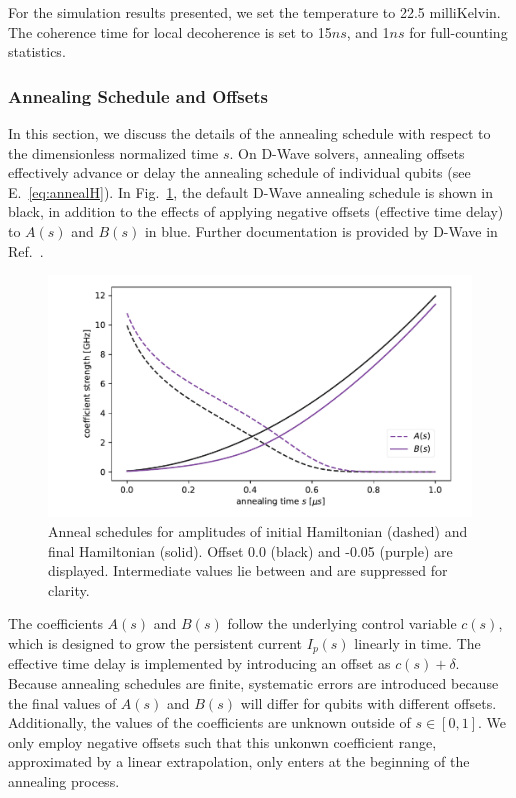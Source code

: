 \documentclass[prd,twocolumn,tightenlines,preprintnumbers,showpacs,superscriptaddress,notitlepage,nofootinbib,eqsecnum,floatfix,longbibliography,aps,10pt]{revtex4-1}
\begin{document}
For the simulation results presented, we set the temperature to 22.5 milliKelvin.
The coherence time for local decoherence is set to 15$ns$, and 1$ns$ for full-counting statistics.

\subsubsection{Annealing Schedule and Offsets}
\label{sec:methods:annealing-schedule}
In this section, we discuss the details of the annealing schedule with respect to the dimensionless normalized time $s$.
On D-Wave solvers, annealing offsets effectively advance or delay the annealing schedule of individual qubits (see E.~\eqref{eq:annealH}).
In Fig.~\ref{fig:anneal_schedule}, the default D-Wave annealing schedule is shown in black, in addition to the effects of applying negative offsets (effective time delay) to $A(s)$ and $B(s)$ in blue.
Further documentation is provided by D-Wave in Ref.~\cite{dwave_as, dwave_as_docu}.

\begin{figure}[htb]
 \centering
  \includegraphics[width=\columnwidth]{./anneal_schedule.pdf}
  \caption{
  Anneal schedules for amplitudes of initial Hamiltonian (dashed) and final Hamiltonian (solid).
  Offset 0.0 (black) and -0.05 (purple) are displayed.
  Intermediate values lie between and are suppressed for clarity.
 }
 \label{fig:anneal_schedule}
\end{figure}

The coefficients $A(s)$ and $B(s)$ follow the underlying control variable $c(s)$, which is designed to grow the persistent current $I_p(s)$ linearly in time.
The effective time delay is implemented by introducing an offset as $c(s) + \delta$.
Because annealing schedules are finite, systematic errors are introduced because the final values of $A(s)$ and $B(s)$ will differ for qubits with different offsets.
Additionally, the values of the coefficients are unknown outside of $s\in [0, 1]$.
We only employ negative offsets such that this unkonwn coefficient range, approximated by a linear extrapolation, only enters at the beginning of the annealing process.
\end{document}
